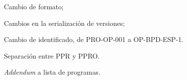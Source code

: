 \begin{changelog}[simple, sectioncmd=\subsection*,label=changelog-1.2]
	\begin{version}[v=2.1, date=2023--01, author=Pablo E. Alanis]
			\item Cambio de formato;
			\item Cambios en la serialización de versiones;
			\item Cambio de identificado, de PRO-OP-001 a OP-BPD-ESP-1.
			\item Separación entre PPR y PPRO.
	\end{version}

	\begin{version}[v=1.9, date=2022-05, author=Alonso M.]
		\item \textit{Addendum} a lista de programas.
	\end{version}
\end{changelog}